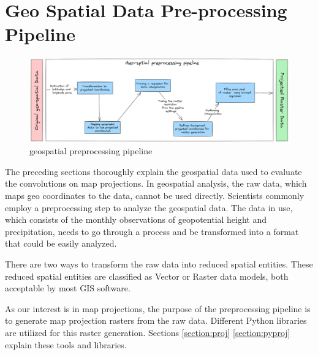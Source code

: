 
\clearpage
\cleardoublepage

\chapter{Geo Spatial Data Pre-processing Pipeline}
\label{chap:preprocess}
\begin{figure}[h]
    \centering
    \includegraphics[width=1.0\linewidth]{figures/chapter-7/preprocessing_pipeline.png}
    \caption{geospatial preprocessing pipeline}
    \label{fig:preprocessingpipeline}
\end{figure}
The preceding sections thoroughly explain the geospatial data used to evaluate the convolutions on map projections. In geospatial analysis, the raw data, which maps geo coordinates to the data, cannot be used directly. Scientists commonly employ a preprocessing step to analyze the geospatial data. The data in use, which consists of the monthly observations of geopotential height and precipitation, needs to go through a process and be transformed into a format that could be easily analyzed.

There are two ways to transform the raw data into reduced spatial entities. These reduced spatial entities are classified as Vector or Raster data models, both acceptable by most GIS software.

As our interest is in map projections, the purpose of the preprocessing pipeline is to generate map projection rasters from the raw data. Different Python libraries are utilized for this raster generation.
Sections \autoref{section:proj} \autoref{section:pyproj} explain these tools and libraries.

